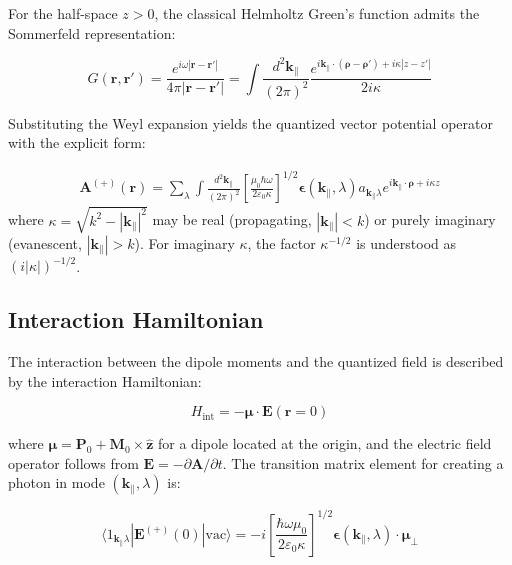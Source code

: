 \documentclass[%
 reprint,
 amsmath,amssymb,
 aps,
 floatfix,
]{revtex4-2}
\begin{document}
For the half-space $z > 0$, the classical Helmholtz Green's function admits the Sommerfeld representation:

\begin{equation}
G(\mathbf{r},\mathbf{r}') = \frac{e^{i\omega|\mathbf{r}-\mathbf{r}'|}}{4\pi|\mathbf{r}-\mathbf{r}'|} = \int\frac{d^2\mathbf{k}_\parallel}{(2\pi)^2}\frac{e^{i\mathbf{k}_\parallel\cdot(\boldsymbol{\rho}-\boldsymbol{\rho}')+i\kappa|z-z'|}}{2i\kappa}
\end{equation}

Substituting the Weyl expansion yields the quantized vector potential operator with the explicit form:

\begin{align}
\mathbf{A}^{(+)}(\mathbf{r}) = \sum_{\lambda}\int\frac{d^2\mathbf{k}_\parallel}{(2\pi)^2}
\left[\frac{\mu_0\hbar\omega}{2\varepsilon_0\kappa}\right]^{1/2}
\boldsymbol{\epsilon}(\mathbf{k}_\parallel,\lambda)a_{\mathbf{k}_\parallel\lambda}
e^{i\mathbf{k}_\parallel\cdot\boldsymbol{\rho}+i\kappa z}
\end{align}
where $\kappa = \sqrt{k^2 - |\mathbf{k}_\parallel|^2}$ may be real (propagating, $|\mathbf{k}_\parallel|<k$) or purely imaginary (evanescent, $|\mathbf{k}_\parallel|>k$). For imaginary $\kappa$, the factor $\kappa^{-1/2}$ is understood as $(i|\kappa|)^{-1/2}$.

\subsection{Interaction Hamiltonian}

The interaction between the dipole moments and the quantized field is described by the interaction Hamiltonian:

\begin{equation}
H_{\text{int}} = -\boldsymbol{\mu}\cdot\mathbf{E}(\mathbf{r}=0)
\end{equation}

where $\boldsymbol{\mu} = \mathbf{P}_0 + \mathbf{M}_0 \times \hat{\mathbf{z}}$ for a dipole located at the origin, and the electric field operator follows from $\mathbf{E} = -\partial\mathbf{A}/\partial t$. The transition matrix element for creating a photon in mode $(\mathbf{k}_\parallel,\lambda)$ is:

\begin{equation}
\langle 1_{\mathbf{k}_\parallel\lambda}|\mathbf{E}^{(+)}(0)|\text{vac}\rangle = -i\left[\frac{\hbar\omega\mu_0}{2\varepsilon_0\kappa}\right]^{1/2}\boldsymbol{\epsilon}(\mathbf{k}_\parallel,\lambda)\cdot\boldsymbol{\mu}_\perp
\end{equation}
\end{document}
